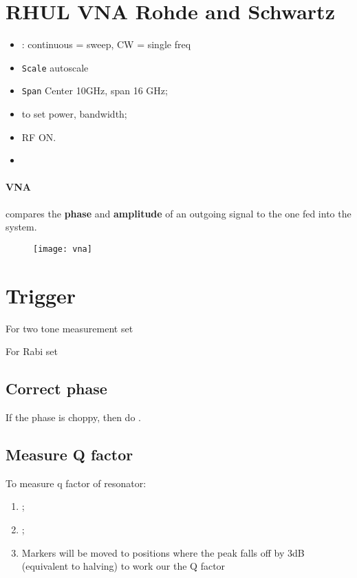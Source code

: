 
\section{RHUL VNA Rohde and Schwartz}
\begin{itemize}
\item {} \ira {}: continuous = sweep, CW = single freq
\item \texttt{Scale} \ira autoscale
\item \texttt{Span} \ira Center 10GHz, span 16 GHz;
\item {} to set power, bandwidth;
\item RF ON.
\item {}
\end{itemize}

\paragraph{VNA} compares the \textbf{phase} and \textbf{amplitude} of an outgoing signal to the one fed into the system.

 \begin{figure}[h]
   \texttt{[image: vna]}
 \end{figure}

 \section{Trigger}
 \label{sec:trigger}

 For two tone measurement set 

 For Rabi set 

 \subsection{Correct phase}
 \label{sec:correct-phase}

 If the phase is choppy, then do .

 \subsection{Measure Q factor}
 \label{sec:measure-q-factor}

 To measure q factor of resonator:
 \begin{enumerate}
 \item {};
 \item {} ;
 \item Markers will  be moved to positions  where the peak falls  off by 3dB (equivalent  to halving) to work  our the Q
   factor
 \end{enumerate}
 \newpage
